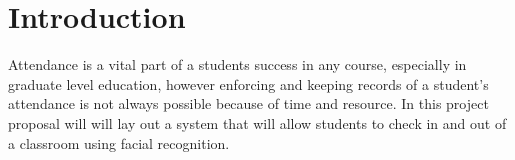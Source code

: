 \section{Introduction}
\label{sec:intro}

Attendance is a vital part of a students success in any course, especially in graduate level education, however enforcing and keeping records of a student's attendance is not always possible because of time and resource. In this project proposal will will lay out a system that will allow students to check in and out of a classroom using facial recognition. 
